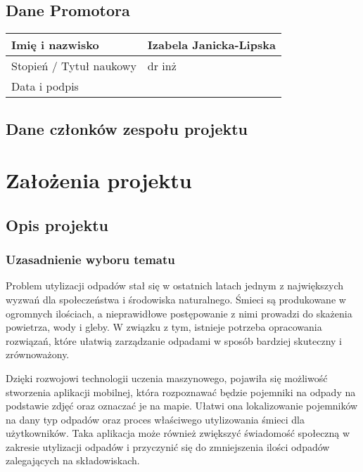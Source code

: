 \documentclass[12pt,oneside]{book}
\begin{document}
\section{Dane Promotora}

\begin{tabular}{ |p{5cm}|p{9cm}|}
    \hline
    Imię i nazwisko & Izabela Janicka-Lipska \\
    \hline
    Stopień / Tytuł naukowy & dr inż \\
    \hline
    Data i podpis &  \\ \hline
\end{tabular}


\pagestyle{plain}

\section{Dane członków zespołu projektu}

\membersTable

{\let\clearpage\relax
    \chapter{Założenia projektu}
    }

\section{Opis projektu}

\subsection{Uzasadnienie wyboru tematu}

Problem utylizacji odpadów stał się w ostatnich latach jednym z największych wyzwań dla społeczeństwa i środowiska naturalnego. Śmieci są produkowane w ogromnych ilościach, a nieprawidłowe postępowanie z nimi prowadzi do skażenia powietrza, wody i gleby. W związku z tym, istnieje potrzeba opracowania rozwiązań, które ułatwią zarządzanie odpadami w sposób bardziej skuteczny i zrównoważony.

Dzięki rozwojowi technologii uczenia maszynowego, pojawiła się możliwość stworzenia aplikacji mobilnej, która rozpoznawać będzie pojemniki na odpady na podstawie zdjęć oraz oznaczać je na mapie. Ułatwi ona lokalizowanie pojemników na dany typ odpadów oraz proces właściwego utylizowania śmieci dla użytkowników. Taka aplikacja może również zwiększyć świadomość społeczną w zakresie utylizacji odpadów i przyczynić się do zmniejszenia ilości odpadów zalegających na składowiskach.
\end{document}
